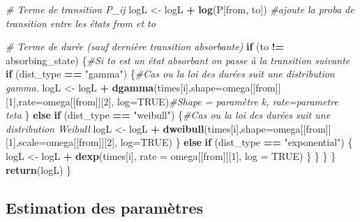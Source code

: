\documentclass[
]{article}
\newenvironment{Shaded}{\begin{snugshade}}{\end{snugshade}}
\newcommand{\AttributeTok}[1]{\textcolor[rgb]{0.13,0.29,0.53}{#1}}
\newcommand{\CommentTok}[1]{\textcolor[rgb]{0.56,0.35,0.01}{\textit{#1}}}
\newcommand{\ConstantTok}[1]{\textcolor[rgb]{0.56,0.35,0.01}{#1}}
\newcommand{\ControlFlowTok}[1]{\textcolor[rgb]{0.13,0.29,0.53}{\textbf{#1}}}
\newcommand{\DecValTok}[1]{\textcolor[rgb]{0.00,0.00,0.81}{#1}}
\newcommand{\FunctionTok}[1]{\textcolor[rgb]{0.13,0.29,0.53}{\textbf{#1}}}
\newcommand{\NormalTok}[1]{#1}
\newcommand{\OtherTok}[1]{\textcolor[rgb]{0.56,0.35,0.01}{#1}}
\newcommand{\SpecialCharTok}[1]{\textcolor[rgb]{0.81,0.36,0.00}{\textbf{#1}}}
\newcommand{\StringTok}[1]{\textcolor[rgb]{0.31,0.60,0.02}{#1}}
\begin{document}
\begin{Shaded}
\begin{Highlighting}[]
      \CommentTok{\# Terme de transition P\_ij}
\NormalTok{      logL }\OtherTok{\textless{}{-}}\NormalTok{ logL }\SpecialCharTok{+} \FunctionTok{log}\NormalTok{(P[from, to]) }\CommentTok{\#ajoute la proba de transition entre les états from et to}
      
      \CommentTok{\# Terme de durée (sauf dernière transition absorbante)}
      \ControlFlowTok{if}\NormalTok{ (to }\SpecialCharTok{!=}\NormalTok{ absorbing\_state) \{}\CommentTok{\#Si to est un état absorbant on passe à la transition suivante}
        \ControlFlowTok{if}\NormalTok{ (dist\_type }\SpecialCharTok{==} \StringTok{"gamma"}\NormalTok{) \{}\CommentTok{\#Cas ou la loi des durées suit une distribution gamma.}
\NormalTok{          logL }\OtherTok{\textless{}{-}}\NormalTok{ logL }\SpecialCharTok{+} \FunctionTok{dgamma}\NormalTok{(times[i],}\AttributeTok{shape=}\NormalTok{omega[[from]][}\DecValTok{1}\NormalTok{],}\AttributeTok{rate=}\NormalTok{omega[[from]][}\DecValTok{2}\NormalTok{], }\AttributeTok{log=}\ConstantTok{TRUE}\NormalTok{)}\CommentTok{\#Shape = paramètre k, rate=parametre teta}
\NormalTok{        \} }\ControlFlowTok{else} \ControlFlowTok{if}\NormalTok{ (dist\_type }\SpecialCharTok{==} \StringTok{"weibull"}\NormalTok{) \{}\CommentTok{\#Cas ou la loi des durées suit une distribution Weibull}
\NormalTok{          logL }\OtherTok{\textless{}{-}}\NormalTok{ logL }\SpecialCharTok{+} \FunctionTok{dweibull}\NormalTok{(times[i],}\AttributeTok{shape=}\NormalTok{omega[[from]][}\DecValTok{1}\NormalTok{],}\AttributeTok{scale=}\NormalTok{omega[[from]][}\DecValTok{2}\NormalTok{], }\AttributeTok{log=}\ConstantTok{TRUE}\NormalTok{)}
\NormalTok{        \} }\ControlFlowTok{else} \ControlFlowTok{if}\NormalTok{ (dist\_type }\SpecialCharTok{==} \StringTok{"exponential"}\NormalTok{) \{}
\NormalTok{          logL }\OtherTok{\textless{}{-}}\NormalTok{ logL }\SpecialCharTok{+} \FunctionTok{dexp}\NormalTok{(times[i], }\AttributeTok{rate =}\NormalTok{ omega[[from]][}\DecValTok{1}\NormalTok{], }\AttributeTok{log =} \ConstantTok{TRUE}\NormalTok{)}
\NormalTok{          \}}
\NormalTok{      \}}
\NormalTok{    \}}
\NormalTok{  \}}
  \FunctionTok{return}\NormalTok{(logL)}
\NormalTok{\}}
\end{Highlighting}
\end{Shaded}

\subsection{Estimation des
paramètres}\label{estimation-des-paramuxe8tres}
\end{document}
